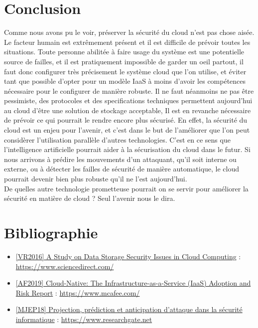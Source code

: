 \documentclass[a4paper, 12pt]{article}
\begin{document}
  \section{Conclusion}
    Comme nous avons pu le voir, préserver la sécurité du cloud n'est pas chose
    aisée. Le facteur humain est extrêmement présent et il est difficile de
    prévoir toutes les situations. Toute personne abilitée à faire usage du
    système est une potentielle source de failles, et il est pratiquement
    impossible de garder un oeil partout, il faut donc configurer très
    précisement le système cloud que l'on utilise, et éviter tant que possible
    d'opter pour un modèle IaaS à moins d'avoir les compétences nécessaire pour
    le configurer de manière robuste. Il ne faut néanmoins ne pas être
    pessimiste, des protocoles et des specifications techniques permettent
    aujourd'hui au cloud d'être une solution de stockage acceptable, Il est en
    revanche nécessaire de prévoir ce qui pourrait le rendre encore plus
    sécurisé. En effet, la sécurité du cloud est un enjeu pour l'avenir, et
    c'est dans le but de l'améliorer que l'on peut considèrer l'utilisation
    parallèle d'autres technologies. C'est en ce sens que l'intelligence
    artificielle pourrait aider à la sécurisation du cloud dans le futur. Si
    nous arrivons à prédire les mouvements d'un attaquant, qu'il soit interne ou
    externe, ou à détecter les failles de sécurité de manière automatique, le
    cloud pourrait devenir bien plus robuste qu'il ne l'est aujourd'hui. \\

    De quelles autre technologie prometteuse pourrait on se servir pour
    améliorer la sécurité en matière de cloud ? Seul l'avenir nous le dira.

  \newpage
  \section{Bibliographie}
    \begin{itemize}
      \item \href{https://www.sciencedirect.com/science/article/pii/S1877050916315812}{[VR2016] A Study on Data Storage Security Issues in Cloud Computing} : \url{https://www.sciencedirect.com/}
      \item \href{https://www.mcafee.com/enterprise/en-us/assets/reports/restricted/rp-cloud-adoption-risk-report-iaas.pdf}{[AF2019] Cloud-Native: The Infrastructure-as-a-Service (IaaS) Adoption and Risk Report} : \url{https://www.mcafee.com/}
      \item \href{https://www.researchgate.net/publication/327449459_Survey_of_Attack_Projection_Prediction_and_Forecasting_in_Cyber_Security}{[MJEP18] Projection, prédiction et anticipation d'attaque dans la sécurité informatique} : \url{https://www.researchgate.net}
    \end{itemize}
\end{document}

